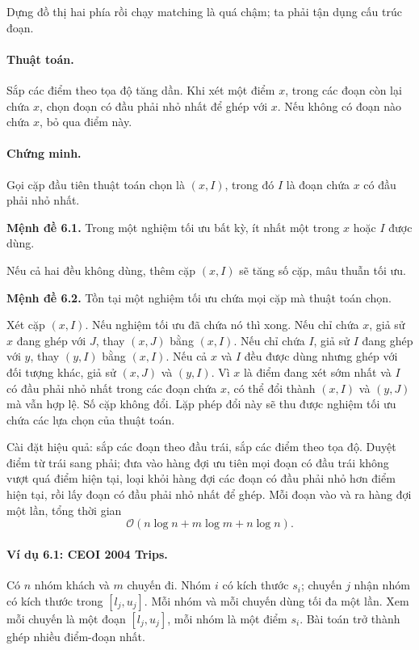 \documentclass[11pt]{article}
\newcommand{\Oh}{\mathcal{O}}
\begin{document}
Dựng đồ thị hai phía rồi chạy matching là quá chậm; ta phải tận dụng cấu trúc
đoạn.

\paragraph{Thuật toán.}
Sắp các điểm theo tọa độ tăng dần. Khi xét một điểm \(x\), trong các đoạn còn
lại chứa \(x\), chọn đoạn có đầu phải nhỏ nhất để ghép với \(x\). Nếu không có
đoạn nào chứa \(x\), bỏ qua điểm này.

\paragraph{Chứng minh.}
Gọi cặp đầu tiên thuật toán chọn là \((x,I)\), trong đó \(I\) là đoạn chứa
\(x\) có đầu phải nhỏ nhất.

\textbf{Mệnh đề 6.1.} Trong một nghiệm tối ưu bất kỳ, ít nhất một trong \(x\)
hoặc \(I\) được dùng.

Nếu cả hai đều không dùng, thêm cặp \((x,I)\) sẽ tăng số cặp, mâu thuẫn tối ưu.

\textbf{Mệnh đề 6.2.} Tồn tại một nghiệm tối ưu chứa mọi cặp mà thuật toán
chọn.

Xét cặp \((x,I)\). Nếu nghiệm tối ưu đã chứa nó thì xong. Nếu chỉ chứa \(x\),
giả sử \(x\) đang ghép với \(J\), thay \((x,J)\) bằng \((x,I)\). Nếu chỉ chứa
\(I\), giả sử \(I\) đang ghép với \(y\), thay \((y,I)\) bằng \((x,I)\). Nếu
cả \(x\) và \(I\) đều được dùng nhưng ghép với đối tượng khác, giả sử
\((x,J)\) và \((y,I)\). Vì \(x\) là điểm đang xét sớm nhất và \(I\) có đầu
phải nhỏ nhất trong các đoạn chứa \(x\), có thể đổi thành \((x,I)\) và
\((y,J)\) mà vẫn hợp lệ. Số cặp không đổi. Lặp phép đổi này sẽ thu được nghiệm
tối ưu chứa các lựa chọn của thuật toán.

Cài đặt hiệu quả: sắp các đoạn theo đầu trái, sắp các điểm theo tọa độ. Duyệt
điểm từ trái sang phải; đưa vào hàng đợi ưu tiên mọi đoạn có đầu trái không
vượt quá điểm hiện tại, loại khỏi hàng đợi các đoạn có đầu phải nhỏ hơn điểm
hiện tại, rồi lấy đoạn có đầu phải nhỏ nhất để ghép. Mỗi đoạn vào và ra hàng
đợi một lần, tổng thời gian
\[
  \Oh(n\log n+m\log m+n\log n).
\]

\paragraph{Ví dụ 6.1: CEOI 2004 Trips.}
Có \(n\) nhóm khách và \(m\) chuyến đi. Nhóm \(i\) có kích thước \(s_i\); chuyến
\(j\) nhận nhóm có kích thước trong \([l_j,u_j]\). Mỗi nhóm và mỗi chuyến dùng
tối đa một lần. Xem mỗi chuyến là một đoạn \([l_j,u_j]\), mỗi nhóm là một điểm
\(s_i\). Bài toán trở thành ghép nhiều điểm-đoạn nhất.
\end{document}
